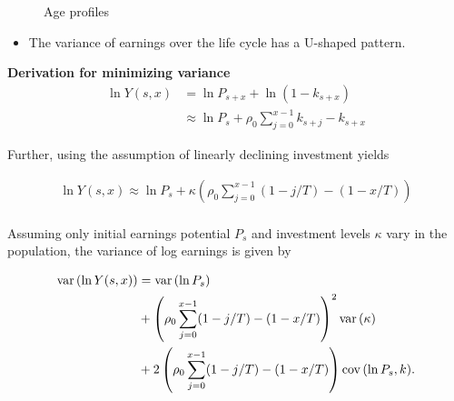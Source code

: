 \begin{frame}
\begin{figure}[htp]\centering
\caption{Age profiles}
\end{figure}
\end{frame}
\begin{frame}
\begin{itemize}
\item The variance of earnings over the life cycle has a U-shaped pattern.
\end{itemize}
\end{frame}
\begin{frame}\textbf{Derivation for minimizing variance}\vspace{0.3cm}
	\begin{align*}
	\ln{Y(s,x)} & = \ln{P_{s+x}} + \ln{(1 - k_{s+x})} \\
	& \approx \ln{P_s} + \rho_0 \sum^{x - 1}_{j=0} k_{s+j} - k_{s+x}
	\end{align*}

	Further, using the assumption of linearly declining investment yields

	\begin{align*}
	\ln{Y(s,x)} \approx \ln{P_s} + \kappa \left(\rho_0 \sum^{x - 1}_{j=0} (1 - j/T) - (1 - x/T)\right) \\
	\end{align*}
\end{frame}
\begin{frame}
	Assuming only initial earnings potential $P_s$ and investment levels $\kappa$ vary in the population, the variance of log earnings is given by

	\begin{align*}
	\mathrm{var}\thinspace(\ln{Y(s,x)}) & = \mathrm{var}\thinspace(\ln{P_s}) \\
	& + \left(\rho_0 \sum^{x - 1}_{j=0} (1 - j/T) - (1 - x/T)\right)^2 \mathrm{var}\thinspace(\kappa) \\
	& + 2\left(\rho_0 \sum^{x - 1}_{j=0} (1 - j/T) - (1 - x/T)\right) \mathrm{cov}\thinspace(\ln{P_s},k).
	\end{align*}
\end{frame}
